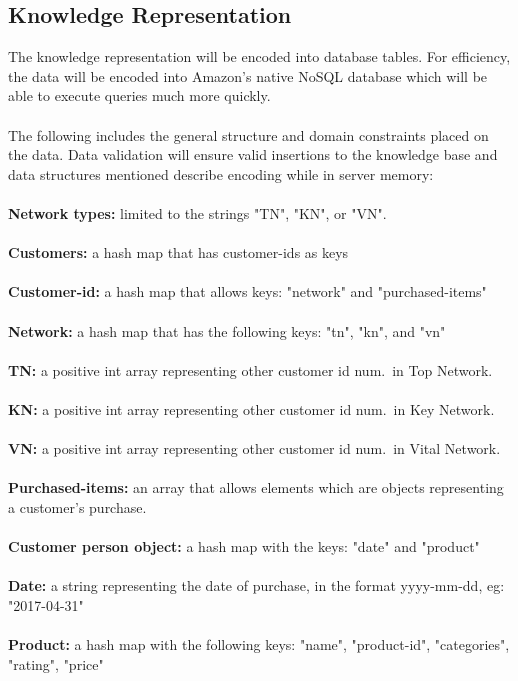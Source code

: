 \documentclass[12pt,a4paper]{article}
\begin{document}
	\subsection*{Knowledge Representation}
		The knowledge representation will be encoded into database tables. For efficiency, the data will be encoded into Amazon's native NoSQL database which will be able to execute queries much more quickly. 
		\\\\
		The following includes the general structure and domain constraints placed on the data. Data validation will ensure valid insertions to the knowledge base and data structures mentioned describe encoding while in server memory: 
		\\\\
		\textbf{Network types:} limited to the strings "TN", "KN", or "VN". \\
		\\
		\textbf{Customers:} a hash map that has customer-ids as keys\\
		\\
		\textbf{Customer-id:} a hash map that allows keys: "network" and "purchased-items"\\
		\\
		\textbf{Network:} a hash map that has the following keys: "tn", "kn", and "vn"\\
		\\
		\textbf{TN:} a positive int array representing other customer id num.\ in Top Network.\\ 
		\\
		\textbf{KN:} a positive int array representing other customer id num.\ in Key Network. \\
		\\
		\textbf{VN:} a positive int array representing other customer id num.\ in Vital Network.\\ 
		\\
		\textbf{Purchased-items:} an array that allows elements which are objects representing a customer's purchase.\\
		\\
		\textbf{Customer person object:} a hash map with the keys: "date" and "product"\\
		\\
		\textbf{Date:} a string representing the date of purchase, in the format yyyy-mm-dd, eg: "2017-04-31"\\
		\\
		\textbf{Product:} a hash map with the following keys: "name", "product-id", "categories", "rating", "price"\\
\end{document}
